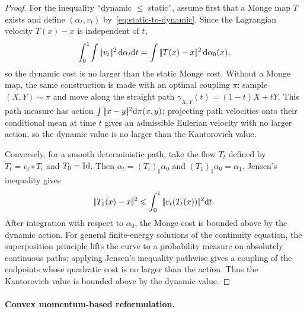 \begin{proof}
	For the inequality ``dynamic $\leq$ static'', assume first that a Monge map $T$ exists and define $(\alpha_t,v_t)$ by~\eqref{eq:static-to-dynamic}. Since the Lagrangian velocity $T(x)-x$ is independent of $t$,
	\[
		\int_0^1\!\int|\!| v_t |\!|^2\,\mathrm{d}\alpha_t\mathrm{d} t
		=
		\int|\!| T(x)-x |\!|^2\,\mathrm{d}\alpha_0(x),
	\]
	so the dynamic cost is no larger than the static Monge cost. Without a Monge map, the same construction is made with an optimal coupling $\pi$: sample $(X,Y)\sim\pi$ and move along the straight path $\gamma_{X,Y}(t)=(1-t)X+tY$. This path measure has action $\int|\!| x-y |\!|^2\mathrm{d}\pi(x,y)$; projecting path velocities onto their conditional mean at time $t$ gives an admissible Eulerian velocity with no larger action, so the dynamic value is no larger than the Kantorovich value.

	Conversely, for a smooth deterministic path, take the flow $T_t$ defined by $\dot T_t=v_t\circ T_t$ and $T_0=\mathrm{Id}$. Then $\alpha_t=(T_t)_\sharp\alpha_0$ and $(T_1)_\sharp\alpha_0=\alpha_1$. Jensen's inequality gives
	\[
		|\!| T_1(x)-x |\!|^2
		\leqslant
		\int_0^1|\!| v_t(T_t(x)) |\!|^2\mathrm{d} t.
	\]
	After integration with respect to $\alpha_0$, the Monge cost is bounded above by the dynamic action. For general finite-energy solutions of the continuity equation, the superposition principle lifts the curve to a probability measure on absolutely continuous paths; applying Jensen's inequality pathwise gives a coupling of the endpoints whose quadratic cost is no larger than the action. Thus the Kantorovich value is bounded above by the dynamic value.
\end{proof}

\paragraph{Convex momentum-based reformulation.}

